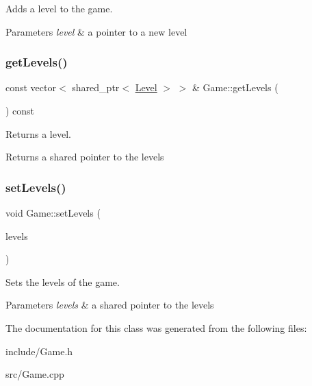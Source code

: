 Adds a level to the game. 


\begin{DoxyParams}{Parameters}
{\em level} & a pointer to a new level \\
\hline
\end{DoxyParams}
\mbox{\label{classGame_a7054929dc897593d0d5bace74398df9b}} 
\subsubsection{\texorpdfstring{get\+Levels()}{getLevels()}}
{\footnotesize\ttfamily const vector$<$ shared\+\_\+ptr$<$ \hyperlink{classLevel}{Level} $>$ $>$ \& Game\+::get\+Levels (\begin{DoxyParamCaption}{ }\end{DoxyParamCaption}) const}



Returns a level. 

\begin{DoxyReturn}{Returns}
a shared pointer to the levels 
\end{DoxyReturn}
\mbox{\label{classGame_ad130d02a37e7754ff619d8b28c5d52ea}} 
\subsubsection{\texorpdfstring{set\+Levels()}{setLevels()}}
{\footnotesize\ttfamily void Game\+::set\+Levels (\begin{DoxyParamCaption}\item[{const vector$<$ shared\+\_\+ptr$<$ \hyperlink{classLevel}{Level} $>$$>$ \&}]{levels }\end{DoxyParamCaption})}



Sets the levels of the game. 


\begin{DoxyParams}{Parameters}
{\em levels} & a shared pointer to the levels \\
\hline
\end{DoxyParams}


The documentation for this class was generated from the following files\+:\begin{DoxyCompactItemize}
\item 
include/Game.\+h\item 
src/Game.\+cpp\end{DoxyCompactItemize}
